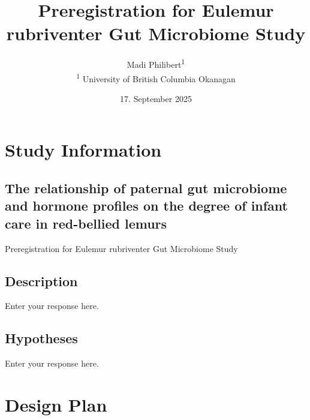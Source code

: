 \documentclass[]{article}
\title{Preregistration for Eulemur rubriventer Gut Microbiome Study}
\author{
          Madi Philibert\textsuperscript{1}          \\ \vspace{0.5cm}
              \textsuperscript{1} University of British Columbia
Okanagan      }
\date{17. September 2025}
\newcounter{question}
\begin{document}
\maketitle
\vspace{2pc}


\ifPDFTeX
  \newcommand\Question[2]{%
   \leavevmode\par
   \stepcounter{question}
   \noindent
   \textbf{\thequestion. #1}. #2\par}
\else %
  \NewCommandCopy{\oldQuestion}{\Question}
  \renewcommand\Question[2]{%
   \leavevmode\par
   \stepcounter{question}
   \noindent
   \textbf{\thequestion. #1}. #2\par}
\fi



\newcommand\Answer[1]{%
    \noindent
    \textit{Registered response}: #1\par}

\section{Study Information}\label{study-information}

\subsection{The relationship of paternal gut microbiome and hormone
profiles on the degree of infant care in red-bellied
lemurs}\label{the-relationship-of-paternal-gut-microbiome-and-hormone-profiles-on-the-degree-of-infant-care-in-red-bellied-lemurs}

Preregistration for Eulemur rubriventer Gut Microbiome Study

\subsection{Description}\label{description}

Enter your response here.

\subsection{Hypotheses}\label{hypotheses}

Enter your response here.

\section{Design Plan}\label{design-plan}
\end{document}
